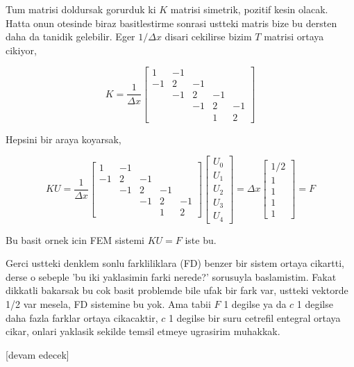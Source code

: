 \documentclass[12pt,fleqn]{article}\usepackage{../../common}
\begin{document}
Tum matrisi doldursak gorurduk ki $K$ matrisi simetrik, pozitif kesin olacak.
Hatta onun otesinde biraz basitlestirme sonrasi ustteki matris bize bu dersten
daha da tanidik gelebilir. Eger $1/\Delta x$ disari cekilirse bizim $T$ matrisi
ortaya cikiyor,

$$
K = \frac{1}{\Delta x}
\left[\begin{array}{rrrrr}
1 & -1   &    & \\
-1  & 2  & -1 &  &   \\
    & -1 &  2 & -1 &   \\
    &    & -1 & 2 & -1  \\
    &    &    & 1  & 2 
\end{array}\right]
$$

Hepsini bir araya koyarsak,

$$
KU =
\frac{1}{\Delta x}
\left[\begin{array}{rrrrr}
1 & -1   &    & \\
-1  & 2  & -1 &  &   \\
    & -1 &  2 & -1 &   \\
    &    & -1 & 2 & -1  \\
    &    &    & 1  & 2 
\end{array}\right]
\left[\begin{array}{r}
U_0 \\ U_1 \\ U_2 \\ U_3 \\ U_4
\end{array}\right] =
\Delta x
\left[\begin{array}{r}
1/2 \\ 1 \\ 1 \\ 1 \\ 1
\end{array}\right] = F
$$

Bu basit ornek icin FEM sistemi $KU = F$ iste bu.

Gerci ustteki denklem sonlu farkliliklara (FD) benzer bir sistem ortaya
cikartti, derse o sebeple 'bu iki yaklasimin farki nerede?' sorusuyla
baslamistim. Fakat dikkatli bakarsak bu cok basit problemde bile ufak
bir fark var, ustteki vektorde 1/2 var mesela, FD sistemine bu yok.
Ama tabii $F$ 1 degilse ya da $c$ 1 degilse daha fazla farklar ortaya
cikacaktir, $c$ 1 degilse bir suru cetrefil entegral ortaya cikar, onlari
yaklasik sekilde temsil etmeye ugrasirim muhakkak. 

















[devam edecek]
\end{document}
